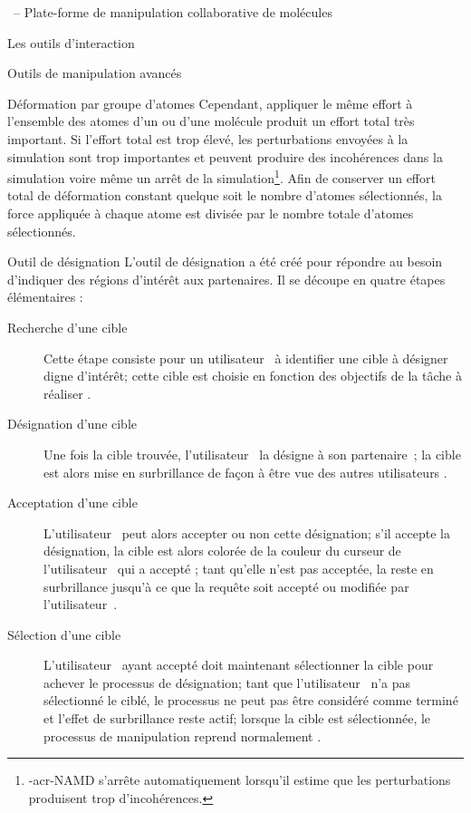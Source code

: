 \documentclass[myfrancais,ngerman,english,frenchb]{mythesis}
\begin{document}
\begin{mychapter}{\myShaddock\ -- Plate-forme de manipulation collaborative de molécules}
\begin{mysection}{Les outils d'interaction}
\begin{mysubsection}{Outils de manipulation avancés}
\begin{mysubsubsection}{Déformation par groupe d'atomes}
					Cependant, appliquer le même effort à l'ensemble des atomes d'un  ou d'une molécule produit un effort total très important.
					Si l'effort total est trop élevé, les perturbations envoyées à la simulation sont trop importantes et peuvent produire des incohérences dans la simulation voire même un arrêt de la simulation\footnote{\myacro-{acr-NAMD} s'arrête automatiquement lorsqu'il estime que les perturbations produisent trop d'incohérences.}.
					Afin de conserver un effort total de déformation constant quelque soit le nombre d'atomes sélectionnés, la force appliquée à chaque atome est divisée par le nombre totale d'atomes sélectionnés.
				\end{mysubsubsection}
				\begin{mysubsubsection}{Outil de désignation}
					L'outil de désignation a été créé pour répondre au besoin d'indiquer des régions d'intérêt aux partenaires.
					Il se découpe en quatre étapes élémentaires :
					\begin{description}
						\item[Recherche d'une cible] Cette étape consiste pour un utilisateur~ à identifier une cible à désigner digne d'intérêt;
							cette cible est choisie en fonction des objectifs de la tâche à réaliser .
						\item[Désignation d'une cible] Une fois la cible trouvée, l'utilisateur~ la désigne à son partenaire~;
							la cible est alors mise en surbrillance de façon à être vue des autres utilisateurs .
						\item[Acceptation d'une cible] L'utilisateur~ peut alors accepter ou non cette désignation;
							s'il accepte la désignation, la cible est alors colorée de la couleur du curseur de l'utilisateur~ qui a accepté ;
							tant qu'elle n'est pas acceptée, la  reste en surbrillance jusqu'à ce que la requête soit accepté ou modifiée par l'utilisateur~.
						\item[Sélection d'une cible] L'utilisateur~ ayant accepté doit maintenant sélectionner la cible pour achever le processus de désignation;
							tant que l'utilisateur~ n'a pas sélectionné le  ciblé, le processus ne peut pas être considéré comme terminé et l'effet de surbrillance reste actif;
							lorsque la cible est sélectionnée, le processus de manipulation reprend normalement .
					\end{description}


\end{mysubsubsection}
\end{mysubsection}
\end{mysection}
\end{mychapter}
\end{document}

